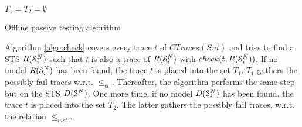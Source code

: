 \begin{algorithm}[h]


$T_1 = T_2 = \emptyset$\;

    \BlankLine
    \BlankLine

    \caption{Offline passive testing algorithm}
    \label{algo:check}
\end{algorithm}

Algorithm \ref{algo:check} covers every trace $t$ of
$CTraces({Sut})$ and tries to find a STS $R(\EuScript{S}_i^{N})$
such that $t$ is also a trace of $R(\EuScript{S}_i^{N})$ with
$check(t, R(\EuScript{S}_i^{N}))$.  If no model
$R(\EuScript{S}_i^{N})$ has been found, the trace $t$ is placed
into the set $T_1$. $T_1$ gathers the possibly fail traces
w.r.t. $\leq_{ct}$. Thereafter, the algorithm performs the same
step but on the STS $D(\EuScript{S}^{N})$. One more time, if no
model $D(\EuScript{S}_i^{N})$ has been found, the trace $t$ is placed
into the set $T_2$.  The latter gathers the possibly fail traces,
w.r.t. the relation $\leq_{mct}$.

